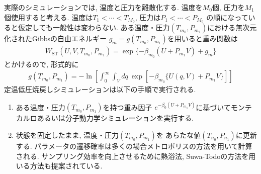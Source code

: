 実際のシミュレーションでは, 温度と圧力を離散化する.
温度を$M_{0}$個, 圧力を$M_{1}$個使用すると考える.
温度は$T_{1} < \cdots < T_{M_{0}}$, 圧力は$P_{1} < \cdots < P_{M_{0}}$
の順になっていると仮定しても一般性は変わらない.
ある温度・圧力$(T_{m_{0}}, P_{m_{1}})$における無次元化されたGibbsの自由エネルギー
$g_{m} = g (T_{m_{0}}, P_{m_{1}})$を用いると重み関数は
\begin{align}
 W_{\mathrm{ST}} (U, V, T_{m_{0}}, P_{m_{1}})
 =
 \exp \{ - \beta_{m_{0}} (U + P_{m_{1}} V) + g_{m} \}
\end{align}
とかけるので, 形式的に
\begin{align}
 g(T_{m_{0}}, P_{m_{1}})
 =
 - \ln \left[ \int_{0}^{\infty} \int_{V} dq~
              \exp [ -\beta_{m_{0}} \{ U(q,V) + P_{m_{1}}V \} ]
       \right]
\end{align}
定温低圧焼戻しシミュレーションは以下の手順で実行される.
\begin{enumerate}
 \item ある温度・圧力$(T_{m_{0}}, P_{m_{1}})$を持つ重み因子
       $e^{-\beta_{0} (U + P_{m_{1}} V)}$に基づいてモンテカルロあるいは分子動力学シミュレーションを実行する.
 \item 状態を固定したまま, 温度・圧力$(T_{m_{0}}, P_{m_{1}})$を
       あらたな値$(T_{n_{0}}, P_{n_{1}})$に更新する.
       パラメータの遷移確率は多くの場合メトロポリスの方法を用いて計算される.
       サンプリング効率を向上させるために熱浴法, 
       Suwa-Todoの方法を用いる方法も提案されている.
\end{enumerate}





